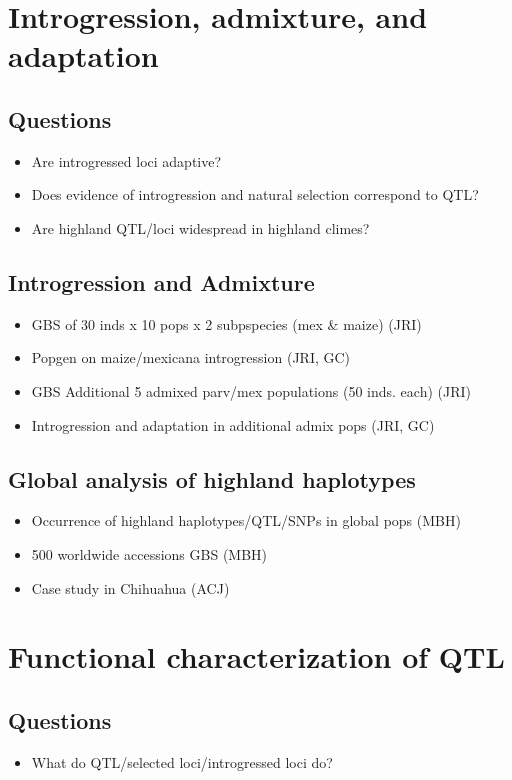 \section{Introgression, admixture, and adaptation}
\subsection{Questions}
\begin{itemize}
\item Are introgressed loci adaptive?
\item Does evidence of introgression and natural selection correspond to QTL?
\item Are highland QTL/loci widespread in highland climes?
\end{itemize}

\subsection{Introgression and Admixture}
\begin{itemize}
\item GBS of 30 inds x 10 pops x 2 subpspecies (mex \& maize) (JRI)
\item Popgen on maize/mexicana introgression (JRI, GC)
\item GBS Additional 5 admixed parv/mex populations (50 inds. each) (JRI)
\item Introgression and adaptation in additional admix pops (JRI, GC)
\end{itemize}

\subsection{Global analysis of highland haplotypes}
\begin{itemize}
\item Occurrence of highland haplotypes/QTL/SNPs in global pops (MBH)
\item 500 worldwide accessions GBS (MBH)
\item Case study in Chihuahua (ACJ)
\end{itemize}

\section{Functional characterization of QTL}

\subsection{Questions}
\begin{itemize}
\item What do QTL/selected loci/introgressed loci do?
\end{itemize}

